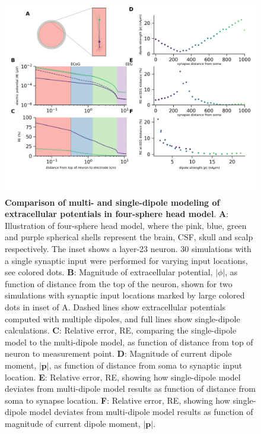 \documentclass[preprint,10pt,authoryear]{elsarticle}
\begin{document}
\begin{figure}[H]
	\centering
	\includegraphics[width=1.0\textwidth]{fig_compare_multi_single_dipole.png}
	\caption{\textbf{Comparison of multi- and single-dipole modeling of extracellular potentials in four-sphere head model}. 
	\textbf{A}: Illustration of four-sphere head model, where the pink, blue, green and purple spherical shells represent the brain, CSF, skull and scalp respectively. The inset shows a layer-23 neuron. $30$ simulations with a single synaptic input were performed for varying input locations, see colored dots.
	\textbf{B}: Magnitude of extracellular potential, $|\phi|$, as function of distance from the top of the neuron, shown for two simulations with synaptic input locations marked by large colored dots in inset of A. Dashed lines show extracellular potentials computed with multiple dipoles, and full lines show single-dipole calculations.
	\textbf{C}: Relative error, RE, comparing the single-dipole model to the multi-dipole model, as function of distance from top of neuron to measurement point.
	\textbf{D}: Magnitude of current dipole moment, $|\mathbf{p}|$, as function of distance from soma to synaptic input location.
	\textbf{E}: Relative error, RE, showing how single-dipole model deviates from multi-dipole model results as function of distance from soma to synapse location.
	\textbf{F}: Relative error, RE, showing how single-dipole model deviates from multi-dipole model results as function of magnitude of current dipole moment, $|\mathbf{p}|$.
	}
	\label{fig:compare_multi_single_dipole}
\end{figure}
\end{document}
